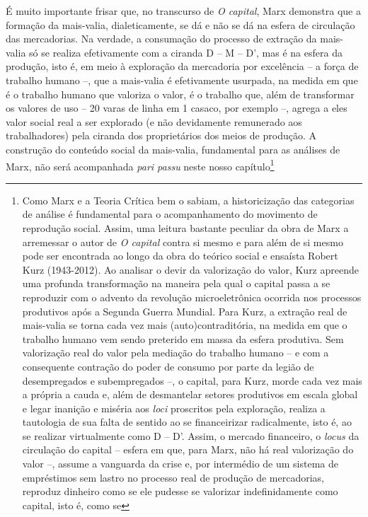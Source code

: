 É muito importante frisar que, no transcurso de \emph{O capital}, Marx
demonstra que a formação da mais-valia, dialeticamente, se dá e não se
dá na esfera de circulação das mercadorias. Na verdade, a consumação do
processo de extração da mais-valia só se realiza efetivamente com a
ciranda D -- M -- D', mas é na esfera da produção, isto é, em meio à
exploração da mercadoria por excelência -- a força de trabalho humano
--, que a mais-valia é efetivamente usurpada, na medida em que é o
trabalho humano que valoriza o valor, é o trabalho que, além de
transformar os valores de uso -- 20 varas de linha em 1 casaco, por
exemplo --, agrega a eles valor social real a ser explorado (e não
devidamente remunerado aos trabalhadores) pela ciranda dos proprietários
dos meios de produção. A construção do conteúdo social da mais-valia,
fundamental para as análises de Marx, não será acompanhada \emph{pari
passu} neste nosso capítulo\footnote{Como Marx e a Teoria Crítica bem o
  sabiam, a historicização das categorias de análise é fundamental para
  o acompanhamento do movimento de reprodução social. Assim, uma leitura
  bastante peculiar da obra de Marx a arremessar o autor de \emph{O
  capital} contra si mesmo e para além de si mesmo pode ser encontrada
  ao longo da obra do teórico social e ensaísta Robert Kurz (1943-2012).
  Ao analisar o devir da valorização do valor, Kurz apreende uma
  profunda transformação na maneira pela qual o capital passa a se
  reproduzir com o advento da revolução microeletrônica ocorrida nos
  processos produtivos após a Segunda Guerra Mundial. Para Kurz, a
  extração real de mais-valia se torna cada vez mais
  (auto)contraditória, na medida em que o trabalho humano vem sendo
  preterido em massa da esfera produtiva. Sem valorização real do valor
  pela mediação do trabalho humano -- e com a consequente contração do
  poder de consumo por parte da legião de desempregados e subempregados
  --, o capital, para Kurz, morde cada vez mais a própria a cauda e,
  além de desmantelar setores produtivos em escala global e legar
  inanição e miséria aos \emph{loci} proscritos pela exploração, realiza
  a tautologia de sua falta de sentido ao se financeirizar radicalmente,
  isto é, ao se realizar virtualmente como D -- D'. Assim, o mercado
  financeiro, o \emph{locus} da circulação do capital -- esfera em que,
  para Marx, não há real valorização do valor --, assume a vanguarda da
  crise e, por intermédio de um sistema de empréstimos sem lastro no
  processo real de produção de mercadorias, reproduz dinheiro como se
  ele pudesse se valorizar indefinidamente como capital, isto é, como se
}

